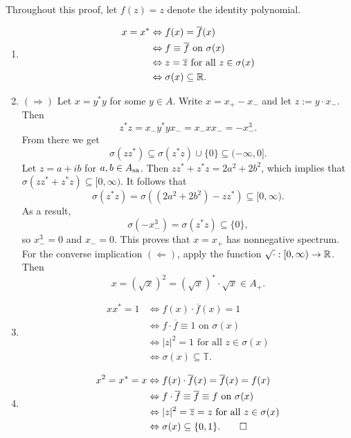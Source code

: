 \begin{myproof}
  Throughout this proof, let $f(z) = z$ denote the identity polynomial.
  \begin{enumerate}
    \item \begin{align*}
      x = x^* &\Leftrightarrow f(x) = \overline{f} (x)\\
      &\Leftrightarrow \textrm{$f \equiv \overline{f}$ on $\sigma(x)$}\\
      &\Leftrightarrow \textrm{$z = \overline{z}$ for all $z \in \sigma(x)$}\\
      &\Leftrightarrow \sigma (x) \subseteq \mathbb {R}.
    \end{align*}
    \item $(\Rightarrow)$ Let $x = y^* y$ for some $y \in A$. Write $x = x_+ - x_-$ and let $z := y \cdot x_-$.
    Then $$z^* z = x_- y^* y x_- = x_- x x_- = -x_-^3.$$
    From there we get 
    $$\sigma (z z^*) \subseteq \sigma(z^* z) \cup \{0\} \subseteq (-\infty, 0].$$
    Let $z = a + ib$ for $a, b \in A_{\operatorname{sa}}$. Then 
    $z z^* + z^* z = 2 a^2 + 2b^2$, which implies that $\sigma(z z^* + z^* z) \subseteq [0, \infty).$
    It follows that $$\sigma (z^* z) = \sigma((2 a^2 + 2b^2) - z z^*) \subseteq [0, \infty).$$
    As a result, $$\sigma(-x_-^3) = \sigma(z^* z) \subseteq \{0\},$$
    so $x_-^3 = 0$ and $x_- = 0$. This proves that $x = x_+$ has nonnegative spectrum.
    For the converse implication $(\Leftarrow)$, apply the function $\sqrt{\cdot}: [0, \infty) \to \mathbb {R}$.
    Then $$x = (\sqrt{x})^2 = (\sqrt{x})^* \cdot \sqrt{x} \in A_+.$$
    \item \begin{align*}
      xx^* = 1 &\Leftrightarrow f(x) \cdot \overline{f} (x) = 1\\
      &\Leftrightarrow \textrm{$f \cdot \overline{f} \equiv 1$ on $\sigma(x)$}\\
      &\Leftrightarrow \textrm{$|z|^2 = 1$ for all $z \in \sigma(x)$}\\
      &\Leftrightarrow \sigma (x) \subseteq \mathbb{T}.
    \end{align*}
    \item \begin{align*}
      x^2 = x^* = x &\Leftrightarrow f(x) \cdot \overline{f} (x) = \overline{f} (x) = f(x)\\
      &\Leftrightarrow \textrm{$f \cdot \overline{f} \equiv \overline{f} \equiv f$ on $\sigma(x)$}\\
      &\Leftrightarrow \textrm{$|z|^2 = \overline{z} = z$ for all $z \in \sigma(x)$}\\
      &\Leftrightarrow \sigma (x) \subseteq \{0, 1\}. \qedhere
    \end{align*}
  \end{enumerate}
\end{myproof}

